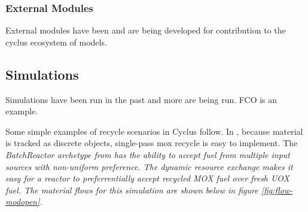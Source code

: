 \subsubsection{External Modules}
External modules have been 
\cite{cyder,separations,streamblender,mktdriveninst,commodconverter} and are 
being \cite{britelite,utk} developed for contribution to the cyclus ecosystem 
of models. 



\subsection{Simulations}


Simulations have been run in the past and more are being run. FCO is an 
example. 

Some simple examples of recycle scenarios in Cyclus follow.  In \Cyclus,
because material is tracked as discrete objects, single-pass mox recycle is
easy to implement.  The \em{BatchReactor} archetype from \Cycamore has the
ability to accept fuel from multiple input sources with non-uniform
preference.  The dynamic resource exchange makes it easy for a reactor to
preferrentially accept recycled MOX fuel over fresh UOX fuel.  The material
flows for this simulation are shown below in figure \ref{fig:flow-modopen}.

